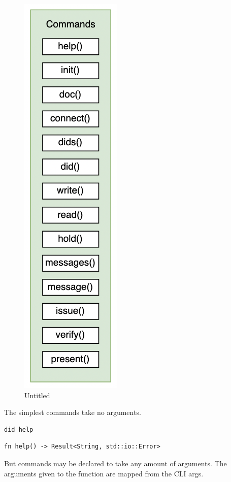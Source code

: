 \begin{figure}
\centering
\includegraphics{Architecture 1442df162dbe45f4a423ba37d3e12363/Untitled 4.png}
\caption{Untitled}
\end{figure}

The simplest commands take no arguments.

\begin{lstlisting}
did help
\end{lstlisting}

\begin{lstlisting}
fn help() -> Result<String, std::io::Error>
\end{lstlisting}

But commands may be declared to take any amount of arguments. The
arguments given to the function are mapped from the CLI args.

